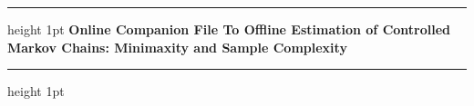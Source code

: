\documentclass[opre,sglanonrev]{informs4}
\numberwithin{equation}{section}
\begin{document}
\begin{APPENDICES}
\vspace{1em} %
    \begin{center}
        \hrule height 1pt \vspace{0.5em} %
        {\Large\bfseries Online Companion File To Offline Estimation of Controlled Markov Chains: Minimaxity and Sample Complexity} %
        \vspace{0.5em} \hrule height 1pt %
    \end{center}
    \vspace{1em} %
{\protect\NoHyper%
    \tableofcontents
    \protect\endNoHyper}%


\end{APPENDICES}
\end{document}
